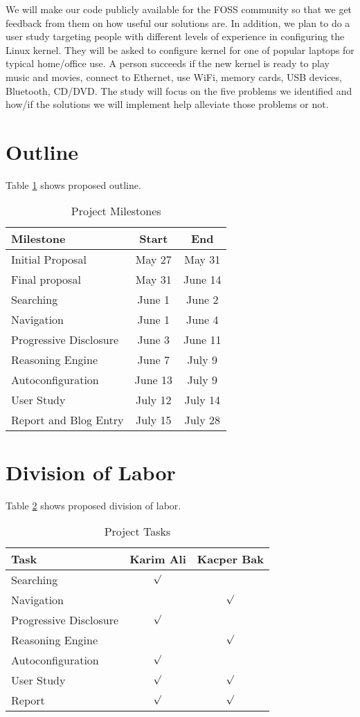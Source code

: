 \documentclass{chi2009}
\begin{document}
We will make our code publicly available for the FOSS community so that we get feedback from them on how useful our solutions are. In addition, we plan to do a user study targeting people with different levels of experience in configuring the Linux kernel. They will be asked to configure kernel for one of popular laptops for typical home/office use. A person succeeds if the new kernel is ready to play music and movies, connect to Ethernet, use WiFi, memory cards, USB devices, Bluetooth, CD/DVD. The study will focus on the five problems we identified and how/if the solutions we will implement help alleviate those problems or not.

\section{Outline}
Table \ref{tab:outline} shows proposed outline.

\begin{table}[!h]
\centering
\begin{tabularx}{0.5\textwidth}{X c c}
\toprule
\textbf{Milestone} & \textbf{Start} & \textbf{End}\\ \midrule
Initial Proposal & May 27 & May 31\\
Final proposal & May 31 & June 14 \\
Searching & June 1 & June 2\\
Navigation & June 1 & June 4\\
Progressive Disclosure & June 3 & June 11\\
Reasoning Engine & June 7 & July 9\\
Autoconfiguration & June 13 & July 9\\
User Study & July 12 & July 14\\
Report and Blog Entry & July 15 & July 28\\
\bottomrule
\end{tabularx}
\caption{Project Milestones}
\label{tab:outline}
\end{table}

\section{Division of Labor}
Table \ref{tab:plan} shows proposed division of labor.

\begin{table}[!h]
\centering
\begin{tabularx}{0.5\textwidth}{X c c}
\toprule
\textbf{Task} & \textbf{Karim Ali} & \textbf{Kacper Bak}\\ \midrule
Searching & $\surd$ &\\
Navigation & & $\surd$\\
Progressive Disclosure & $\surd$ &\\
Reasoning Engine & & $\surd$\\
Autoconfiguration & $\surd$ &\\
User Study & $\surd$ & $\surd$\\
Report & $\surd$ & $\surd$\\
\bottomrule
\end{tabularx}
\caption{Project Tasks}
\label{tab:plan}
\end{table}
\end{document}
